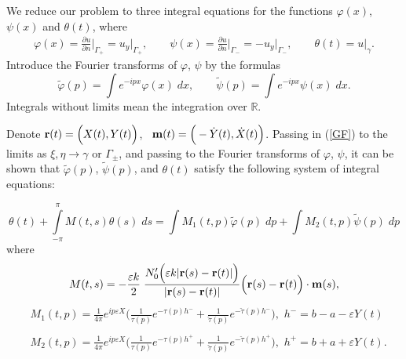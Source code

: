 \documentclass{beamer}
\newcommand{\ds}{\displaystyle}
\newcommand{\R}{\mathbb{R}}
\providecommand{\abs}[1]{\lvert#1\rvert}
\begin{document}
\begin{frame}

 We  reduce our problem to three integral equations for the functions $\varphi(x)$, $\psi(x)$ and $\theta(t)$, where
\begin{align*}
 \varphi(x)=\ds\frac{\partial u}{\partial n}\Big\vert_{\Gamma_{+}}=u_{y}\Big\vert_{\Gamma_{+}},\qquad \psi(x)=\ds\frac{\partial u}{\partial n}\Big\vert_{\Gamma_{-}}=-u_{y}\Big\vert_{\Gamma_{-}}, \qquad
\theta(t)=u\Big\vert_{\gamma}.
\end{align*} 
   Introduce the Fourier transforms of $\varphi$, $\psi$ by the formulas
\begin{equation*}
\tilde{\varphi}(p)=\ds\int e^{-ipx} \varphi(x)\;dx,\qquad \tilde{\psi}(p)=\ds\int e^{-ipx} \psi(x)\;dx.
\end{equation*}
Integrals without limits mean the integration over $\R$.

\end{frame}
\begin{frame}
Denote ${\bf r}(t)=\Big(X(t), Y(t)\Big)$,~ ${\bf m}(t)=\Big(-\dot{Y}(t),\dot{X}(t)\Big)$.
Passing in (\ref{GF}) to the limits as $\xi,\eta\to \gamma\text{ or } \Gamma_\pm$, and passing to the Fourier transforms of $\varphi$, $\psi$, it can be shown that    $\tilde{\varphi}(p)$, $\tilde{\psi}(p)$,  and $\theta(t)$ satisfy the following system of integral equations:
\end{frame}
\begin{frame}
\begin{equation}\label{theta+}
\theta(t)+\ds\int\limits_{-\pi}^{\pi} M(t,s) \theta(s)\; ds=\ds\int M_1(t,p)\tilde{\varphi}(p)\;dp+\ds\int M_2(t,p)\tilde{\psi}(p)\;dp
\end{equation}
where
\begin{equation}\label{M1}
M(t,s)=-\ds\frac{\varepsilon k}{2}\;\ds\frac{N'_0\Big(\varepsilon k\abs{{\bf r}(s)-{\bf r}(t)}\Big)}{\abs{{\bf r}(s)-{\bf r}(t)}}\Big({\bf r}(s)-{\bf r}(t)\Big)\cdot {\bf m}(s),
\end{equation}
\begin{align}\label{KM1}
& M_1(t,p)=\ds\frac{1}{4\pi} e^{ip\varepsilon X}\Bigg(\ds\frac{1}{\tau(p)} e^{-\tau(p)h^{-}}+\ds\frac{1}{\check{\tau}(p)} e^{-\check{\tau}(p)h^{-}}\Bigg),\,\, h^{-}=b-a-\varepsilon Y(t)\\\nonumber\\\label{KM2}
& M_2(t,p)=\ds\frac{1}{4\pi} e^{ip\varepsilon X}\Bigg(\ds\frac{1}{\tau(p)} e^{-\tau(p)h^{+}}+\ds\frac{1}{\check{\tau}(p)} e^{-\check{\tau}(p)h^{+}}\Bigg),\,\, h^{+}=b+a+\varepsilon Y(t).
\end{align}

\end{frame}
\end{document}
